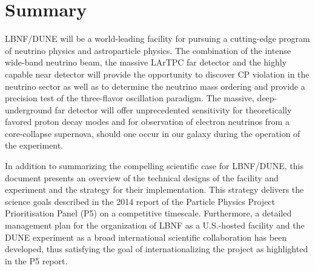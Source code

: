 \chapter{Summary}
\label{ch:project-summary}

LBNF/DUNE will be a world-leading facility for pursuing a cutting-edge program of neutrino physics and astroparticle physics. The 
combination of the intense wide-band neutrino beam, the massive LArTPC far detector and the highly capable near detector will provide 
the opportunity to discover CP violation in the neutrino sector as well as to determine the neutrino mass ordering and provide a 
precision test of the three-flavor oscillation paradigm. The massive, deep-underground far detector will offer unprecedented sensitivity for  
theoretically favored proton decay modes 
and for observation of electron neutrinos from a core-collapse supernova, should one occur in our galaxy during the operation of the experiment.

In addition to summarizing the compelling scientific case for LBNF/DUNE, this document presents an overview of the technical 
designs of the facility and experiment and the strategy for their implementation. 
This strategy delivers the science goals described in the 2014 report of the Particle Physics Project Prioritisation Panel (P5) on a 
competitive timescale. Furthermore, a detailed management plan for the 
organization of LBNF as a U.S.-hosted facility and the DUNE experiment 
as a broad international scientific collaboration has been developed, thus satisfying the goal of internationalizing the project as highlighted in the 
P5 report.

